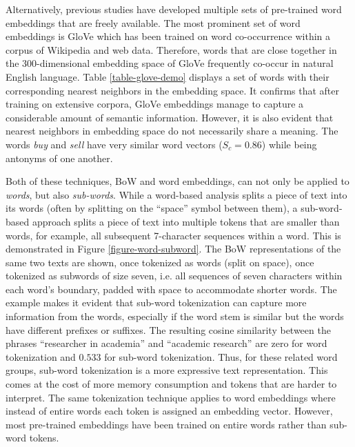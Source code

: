 Alternatively, previous studies have developed multiple sets of pre-trained word embeddings that are freely available. The most prominent set of word embeddings is GloVe  which has been trained on word co-occurrence within a corpus of Wikipedia and web data. Therefore, words that are close together in the 300-dimensional embedding space of GloVe frequently co-occur in natural English language. Table \ref{table-glove-demo} displays a set of words with their corresponding nearest neighbors in the embedding space. It confirms that after training on extensive corpora, GloVe embeddings manage to capture a considerable amount of semantic information. However, it is also evident that nearest neighbors in embedding space do not necessarily share a meaning. The words \emph{buy} and \emph{sell} have very similar word vectors ($S_c = 0.86$) while being antonyms of one another.



Both of these techniques, BoW and word embeddings, can not only be applied to \emph{words}, but also \emph{sub-words}. While a word-based analysis splits a piece of text into its words (often by splitting on the ``space'' symbol between them), a sub-word-based approach splits a piece of text into multiple tokens that are smaller than words, for example, all subsequent 7-character sequences within a word. This is demonstrated in Figure \ref{figure-word-subword}. The BoW representations of the same two texts are shown, once tokenized as words (split on space), once tokenized as subwords of size seven, i.e. all sequences of seven characters within each word's boundary, padded with space to accommodate shorter words. The example makes it evident that sub-word tokenization can capture more information from the words, especially if the word stem is similar but the words have different prefixes or suffixes. The resulting cosine similarity between the phrases ``researcher in academia'' and ``academic research'' are zero for word tokenization and $0.533$ for sub-word tokenization. Thus, for these related word groups, sub-word tokenization is a more expressive text representation. This comes at the cost of more memory consumption and tokens that are harder to interpret. The same tokenization technique applies to word embeddings where instead of entire words each token is assigned an embedding vector. However, most pre-trained embeddings have been trained on entire words rather than sub-word tokens.


